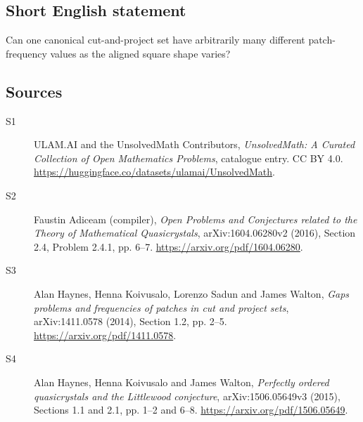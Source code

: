 \documentclass[11pt]{article}
\begin{document}
\subsection{Short English statement}
Can one canonical cut-and-project set have arbitrarily many different patch-frequency values as the aligned square shape varies?
\subsection{Sources}
\begin{description}
\item[\hypertarget{source:statement:1}{S1}] ULAM.AI and the UnsolvedMath Contributors, \emph{UnsolvedMath: A Curated Collection of Open Mathematics Problems}, catalogue entry. CC BY 4.0. \url{https://huggingface.co/datasets/ulamai/UnsolvedMath}.
\item[\hypertarget{source:statement:2}{S2}] Faustin Adiceam (compiler), \emph{Open Problems and Conjectures related to the Theory of Mathematical Quasicrystals}, arXiv:1604.06280v2 (2016), Section 2.4, Problem 2.4.1, pp. 6--7. \url{https://arxiv.org/pdf/1604.06280}.
\item[\hypertarget{source:statement:3}{S3}] Alan Haynes, Henna Koivusalo, Lorenzo Sadun and James Walton, \emph{Gaps problems and frequencies of patches in cut and project sets}, arXiv:1411.0578 (2014), Section 1.2, pp. 2--5. \url{https://arxiv.org/pdf/1411.0578}.
\item[\hypertarget{source:statement:4}{S4}] Alan Haynes, Henna Koivusalo and James Walton, \emph{Perfectly ordered quasicrystals and the Littlewood conjecture}, arXiv:1506.05649v3 (2015), Sections 1.1 and 2.1, pp. 1--2 and 6--8. \url{https://arxiv.org/pdf/1506.05649}.
\end{description}
\label{end:statement}
\end{document}
